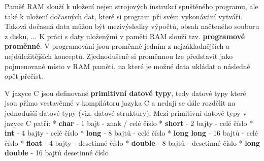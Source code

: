 Paměť RAM slouží k uložení nejen strojových instrukcí spuštěného programu, ale také k uložení dočasných dat, které si program při svém vykonávání vytváří. Taková dočasná data můžou být mezivýsledky výpočtů, obsah načteného souboru z disku, ... K práci s daty uloženými v paměti RAM slouží tzv. {\bf programové proměnné}. V programování jsou proměnné jedním z nejzákladnějších a nejdůležitějších konceptů. Zjednodušeně si proměnnou lze představit jako pojmenované místo v RAM paměti, na které je možné data ukládat a následně opět přečíst. 




V jazyce C jsou definované {\bf primitivní datové typy}, tedy datové typy které jsou přímo vestavěnné v kompilátoru jazyka C a nedají se dále rozdělit na jednodušší datové typy (viz. datové struktury). Mezi primitivní datové typy v jazyce C patří:
\begitems
* {\bf char} - 1 bajt - znak / celé číslo
* {\bf short} - 2 bajty - celé číslo
* {\bf int} - 4 bajty - celé číslo
* {\bf long} - 8 bajtů - celé číslo
* {\bf long long} - 16 bajtů - celé číslo 
* {\bf float} - 4 bajty - desetinné číslo
* {\bf double} - 8 bajtů - desetinné číslo
* {\bf long double} - 16 bajtů desetinné číslo  
\enditems




